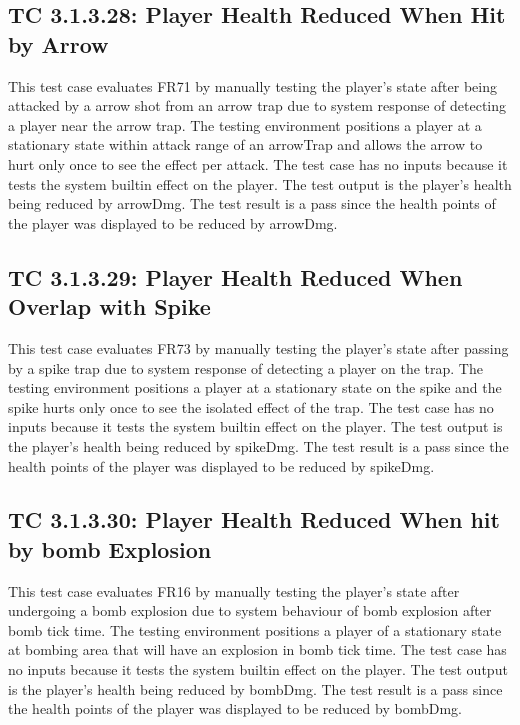 \documentclass[12pt, titlepage]{article}
\begin{document}
\subsection*{TC 3.1.3.28: Player Health Reduced When Hit by Arrow}
This test case evaluates FR71 by manually testing the player's state after being attacked by a arrow shot from an arrow trap due to system response of detecting a player near the arrow trap. The testing environment positions a player at a stationary state within attack range of an arrowTrap and allows the arrow to hurt only once to see the effect per attack. The test case has no inputs because it tests the system builtin effect on the player. The test output is the player's health being reduced by arrowDmg. The test result is a pass since the health points of the player was displayed to be reduced by arrowDmg.

\subsection*{TC 3.1.3.29: Player Health Reduced When Overlap with Spike}
This test case evaluates FR73 by manually testing the player's state after passing by a spike trap due to system response of detecting a player on the trap. The testing environment positions a player at a stationary state on the spike and the spike hurts only once to see the isolated effect of the trap. The test case has no inputs because it tests the system builtin effect on the player. The test output is the player's health being reduced by spikeDmg. The test result is a pass since the health points of the player was displayed to be reduced by spikeDmg.

\subsection*{TC 3.1.3.30: Player Health Reduced When hit by bomb Explosion}
This test case evaluates FR16 by manually testing the player's state after undergoing a bomb explosion due to system behaviour of bomb explosion after bomb tick time. The testing environment positions a player of a stationary state at bombing area that will have an explosion in bomb tick time. The test case has no inputs because it tests the system builtin effect on the player. The test output is the player's health being reduced by bombDmg. The test result is a pass since the health points of the player was displayed to be reduced by bombDmg.
\end{document}
